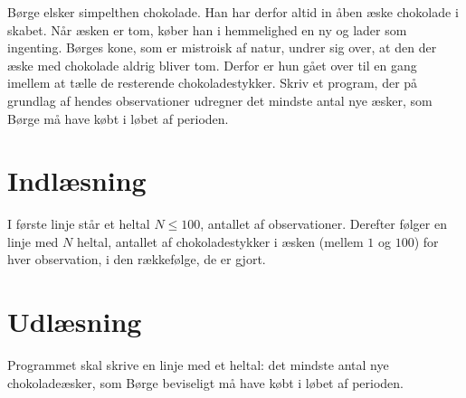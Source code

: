 Børge elsker simpelthen chokolade.
Han har derfor altid in åben æske chokolade i skabet.
Når æsken er tom, køber han i hemmelighed en ny og lader som ingenting.
Børges kone, som er mistroisk af natur, undrer sig over, at den der æske med chokolade aldrig bliver tom.
Derfor er hun gået over til en gang imellem at tælle de resterende chokoladestykker. 
Skriv et program, der på grundlag af hendes observationer udregner det mindste antal nye æsker, som Børge må have købt i løbet af perioden.

\section*{Indlæsning}
I første linje står et heltal $N \le 100$, antallet af observationer.
Derefter følger en linje med $N$ heltal, antallet af chokoladestykker i æsken (mellem $1$ og $100$) for hver observation, i den rækkefølge, de er gjort.

\section*{Udlæsning}
Programmet skal skrive en linje med et heltal: det mindste antal nye chokoladeæsker, som Børge beviseligt må have købt i løbet af perioden.
